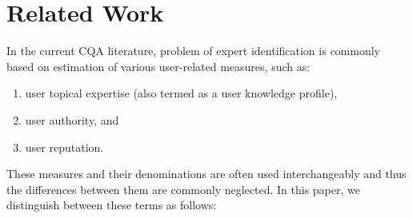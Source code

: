 \documentclass{llncs}
\begin{document}
	\section{Related Work}
	In the current CQA literature, problem of expert identification is commonly
	based on estimation of various user-related measures, such as:
		\begin{enumerate}
			\item user topical expertise (also termed as a user knowledge profile),
			\item user authority, and
			\item user reputation.
		\end{enumerate}
	These measures and their denominations are often used interchangeably and
	thus the differences between them are commonly neglected. In this paper, we
	distinguish between these terms as follows:
\end{document}
